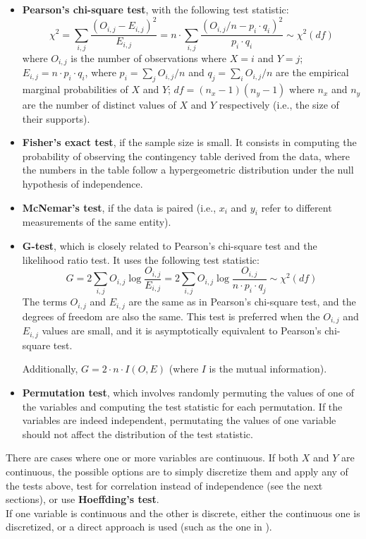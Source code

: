 \begin{itemize}
    \item \textbf{Pearson's chi-square test}, with the following test statistic:
    \begin{equation*}
        \chi^2 = \sum_{i,j} \frac{(O_{i,j} - E_{i,j})^2}{E_{i,j}} = n \cdot \sum_{i,j} \frac{(O_{i,j}/n - p_i \cdot q_i)^2}{p_i \cdot q_i} \sim \chi^2(\textit{df})
    \end{equation*}
    where $O_{i,j}$ is the number of observations where $X = i$ and $Y = j$; $E_{i,j} = n \cdot p_i \cdot q_i$, where $p_i = \sum_{j} O_{i,j}/n$ and $q_j = \sum_{i} O_{i,j}/n$ are the empirical marginal probabilities of $X$ and $Y$; $\textit{df} = (n_x - 1)(n_y - 1)$ where $n_x$ and $n_y$ are the number of distinct values of $X$ and $Y$ respectively (i.e., the size of their supports).
    \item \textbf{Fisher's exact test}, if the sample size is small. It consists in computing the probability of observing the contingency table derived from the data, where the numbers in the table follow a hypergeometric distribution under the null hypothesis of independence.
    \item \textbf{McNemar's test}, if the data is paired (i.e., $x_i$ and $y_i$ refer to different measurements of the same entity).
    \item \textbf{G-test}, which is closely related to Pearson's chi-square test and the likelihood ratio test. It uses the following test statistic:
    \begin{equation*}
        G = 2 \sum_{i,j} O_{i,j} \log \frac{O_{i,j}}{E_{i,j}} = 2 \sum_{i,j} O_{i,j} \log \frac{O_{i,j}}{n \cdot p_i \cdot q_j} \sim \chi^2(\textit{df})
    \end{equation*}
    The terms $O_{i,j}$ and $E_{i,j}$ are the same as in Pearson's chi-square test, and the degrees of freedom are also the same. This test is preferred when the $O_{i,j}$ and $E_{i,j}$ values are small, and it is asymptotically equivalent to Pearson's chi-square test.

    Additionally, $G = 2 \cdot n \cdot I(O,E)$ (where $I$ is the mutual information).
    \item \textbf{Permutation test}, which involves randomly permuting the values of one of the variables and computing the test statistic for each permutation. If the variables are indeed independent, permutating the values of one variable should not affect the distribution of the test statistic.
\end{itemize}
There are cases where one or more variables are continuous. If both $X$ and $Y$ are continuous, the possible options are to simply discretize them and apply any of the tests above, test for correlation instead of independence (see the next sections), or use \textbf{Hoeffding's test}. \\
If one variable is continuous and the other is discrete, either the continuous one is discretized, or a direct approach is used (such as the one in \cite{yanga2020independence}).

